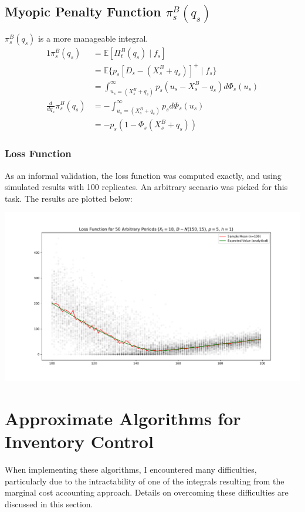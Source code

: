 \documentclass[12pt]{article}
\newcommand{\EX}{\mathbb{E}}
\begin{document}
\subsection{Myopic Penalty Function $\pi_s^B(q_s)$}

$\pi_s^B(q_s)$ is a more manageable integral.
\begin{alignat}{1}
	\pi_s^B(q_s) &= \EX [\Pi_t^B(q_s) \; | \; f_s] \nonumber \\
		&= \EX \bigg\{ p_s [D_s - (X_s^B + q_s)]^+  \; | \; f_s \bigg\} \nonumber \\
		&= \int_{u_s=({X_s^B + q_s})}^{\infty} p_s (u_s - X_s^B - q_s) d\Phi_s(u_s) \\
	\frac{d}{d q_s} \pi_s^B(q_s) &=  - \int_{u_s=({X_s^B + q_s})}^{\infty} p_s d\Phi_s(u_s) \nonumber \\
		&= - p_s (1 - \Phi_s(X_s^B + q_s)) 
\end{alignat}

\subsubsection{Loss Function}

As an informal validation, the loss function was computed exactly, and using simulated results with 100 replicates. An arbitrary scenario was picked for this task. The results are plotted below:

\includegraphics[width=\textwidth]{loss.pdf}

\section{Approximate Algorithms for Inventory Control}

When implementing these algorithms, I encountered many difficulties, particularly due to the intractability of one of the integrals resulting from the marginal cost accounting approach. Details on overcoming these difficulties are discussed in this section. 
\end{document}
